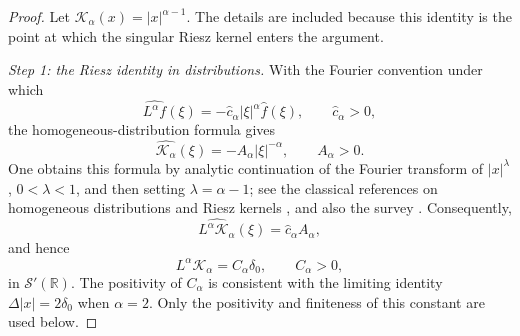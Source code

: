 \documentclass[11pt]{article}
\newcommand{\R}{\mathbb{R}}
\newcommand{\1}{\mathbf{1}}
\newcommand{\RieszK}{\mathcal K_\alpha}
\begin{document}
\begin{proof}
Let $\RieszK(x)=|x|^{\alpha-1}$. The details are included because this identity is the point at which the singular Riesz kernel enters the argument.

\emph{Step 1: the Riesz identity in distributions.} With the Fourier convention under which
\[
  \widehat{L^\alpha f}(\xi)=-\widehat c_\alpha |\xi|^\alpha\widehat f(\xi),
  \qquad \widehat c_\alpha>0,
\]
the homogeneous-distribution formula gives
\[
  \widehat{\RieszK}(\xi)=-A_\alpha |\xi|^{-\alpha},
  \qquad A_\alpha>0.
\]
One obtains this formula by analytic continuation of the Fourier transform of $|x|^\lambda$, $0<\lambda<1$, and then setting $\lambda=\alpha-1$; see the classical references on homogeneous distributions and Riesz kernels \cite{GelfandShilov1964,Landkof1972}, and also the survey \cite{Kwasnicki2017}. Consequently,
\[
  \widehat{L^\alpha\RieszK}(\xi)=\widehat c_\alpha A_\alpha,
\]
and hence
\begin{equation}\label{eq:riesz-identity}
  L^\alpha\RieszK=C_\alpha\delta_0,
  \qquad C_\alpha>0,
\end{equation}
in $\mathcal S'(\R)$. The positivity of $C_\alpha$ is consistent with the limiting identity $\Delta |x|=2\delta_0$ when $\alpha=2$. Only the positivity and finiteness of this constant are used below.


\end{proof}
\end{document}
